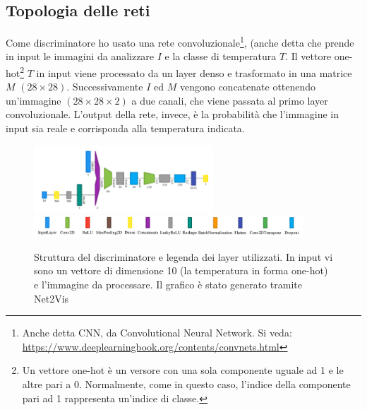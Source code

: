 \documentclass[a4paper]{article}
\begin{document}
\subsection{Topologia delle reti}
Come discriminatore ho usato una rete convoluzionale\footnote{Anche detta CNN, da Convolutional Neural Network. Si veda: \url{https://www.deeplearningbook.org/contents/convnets.html}}, (anche detta che prende in input le immagini da analizzare $I$ e la classe di temperatura $T$. Il vettore one-hot\footnote{Un vettore one-hot è un versore con una sola componente uguale ad 1 e le altre pari a 0. Normalmente, come in questo caso, l'indice della componente pari ad 1 rappresenta un'indice di classe.} $T$ in input viene processato da un layer denso e trasformato in una matrice $M$ $(28\times28)$. Successivamente $I$ ed $M$ vengono concatenate ottenendo un'immagine $(28\times28\times2)$ a due canali, che viene passata al primo layer convoluzionale. L'output della rete, invece, è la probabilità che l'immagine in input sia reale e corrisponda alla temperatura indicata.
\begin{figure}[H]
\includegraphics[width=0.6\textwidth]{dis.png}\\
\includegraphics[width=0.9\textwidth]{legend.jpg}
\centering
\caption[...]{Struttura del discriminatore e legenda dei layer utilizzati\protect\footnotemark. In input vi sono un vettore di dimensione 10 (la temperatura in forma one-hot) e l'immagine da processare. Il grafico è stato generato tramite Net2Vis \cite{net2vis}}
\end{figure}
\end{document}
